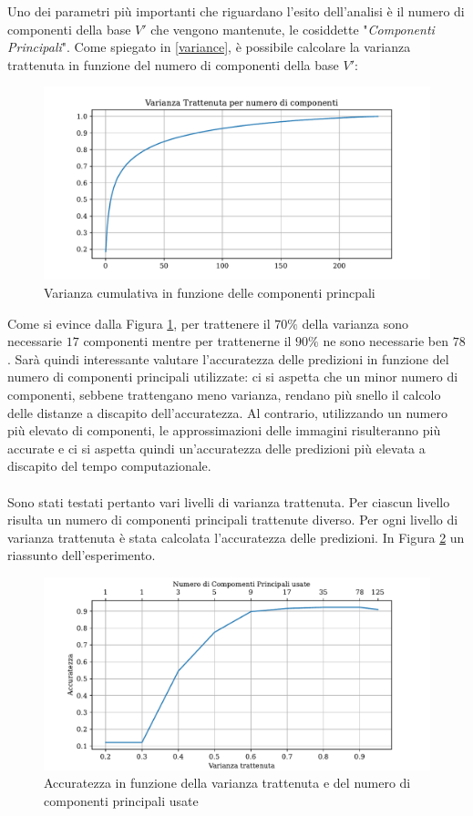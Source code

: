 Uno dei parametri più importanti che riguardano l'esito dell'analisi è il numero di componenti della base \(V'\) che vengono mantenute, le cosiddette "\textit{Componenti Principali}". Come spiegato in \ref{variance}, è possibile calcolare la varianza trattenuta in funzione del numero di componenti della base \(V'\):
\begin{figure}[H]
    \centering
    \includegraphics[scale = 0.7]{pictures/variance_cum.pdf}
    \caption{Varianza cumulativa in funzione delle componenti princpali}
    \label{cum_variance_graph}
\end{figure}
\noindent Come si evince dalla Figura \ref{cum_variance_graph}, per trattenere il \(70\%\) della varianza sono necessarie \(17\) componenti mentre per trattenerne il \(90\%\) ne sono necessarie ben \(78\). Sarà quindi interessante valutare l'accuratezza delle predizioni in funzione del numero di componenti principali utilizzate: ci si aspetta che un minor numero di componenti, sebbene trattengano meno varianza, rendano più snello il calcolo delle distanze a discapito dell'accuratezza. Al contrario, utilizzando un numero più elevato di componenti, le approssimazioni delle immagini risulteranno più accurate e ci si aspetta quindi un'accuratezza delle predizioni più elevata a discapito del tempo computazionale. 
\\
\\
Sono stati testati pertanto vari livelli di varianza trattenuta. Per ciascun livello risulta un numero di componenti principali trattenute diverso. Per ogni livello di varianza trattenuta è stata calcolata l'accuratezza delle predizioni. In Figura \ref{accuracy_vs_pc graph} un riassunto dell'esperimento.
\begin{figure}[H]
    \centering
    \includegraphics[scale = 0.7]{pictures/accuracy_vs_pcs.pdf}
    \caption{Accuratezza in funzione della varianza trattenuta e del numero di componenti principali usate}
    \label{accuracy_vs_pc graph}
\end{figure}
